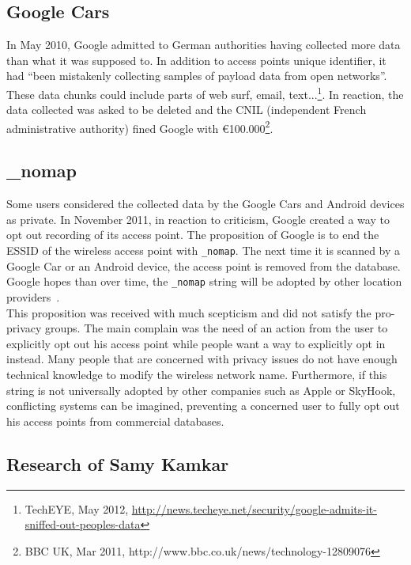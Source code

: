 \subsection{Google Cars}
In May 2010, Google admitted to German authorities having collected more data than what it was supposed to.
In addition to access points unique identifier, it had ``been mistakenly collecting samples of payload data from open networks''.
These data chunks could include parts of web surf, email, text...\footnote{TechEYE, May 2012, \url{http://news.techeye.net/security/google-admits-it-sniffed-out-peoples-data}}.
In reaction, the data collected was asked to be deleted and the CNIL (independent French administrative authority) fined Google with €100.000\footnote{BBC UK, Mar 2011, http://www.bbc.co.uk/news/technology-12809076}.\\

\subsection{\_nomap}

Some users considered the collected data by the Google Cars and Android devices as private.
In November 2011, in reaction to criticism, Google created a way to opt out recording of its access point.
The proposition of Google is to end the ESSID of the wireless access point with \texttt{\_nomap}.
The next time it is scanned by a Google Car or an Android device, the access point is removed from the database.
Google hopes than over time, the \texttt{\_nomap} string will be adopted by other location providers~\cite{nomap}.\\

This proposition was received with much scepticism and did not satisfy the pro-privacy groups.
The main complain was the need of an action from the user to explicitly opt out his access point while people want a way to explicitly opt in instead.
Many people that are concerned with privacy issues do not have enough technical knowledge to modify the wireless network name.
Furthermore, if this string is not universally adopted by other companies such as Apple or SkyHook, conflicting systems can be imagined, preventing a concerned user to fully opt out his access points from commercial databases.

\subsection{Research of Samy Kamkar}
\label{sec:andro-samy}

